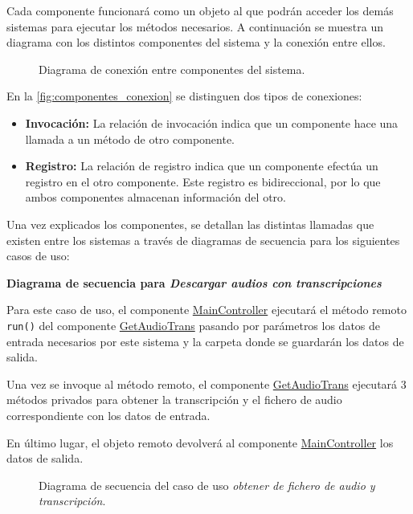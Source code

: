 \documentclass[../main.tex]{subfiles}
\begin{document}
Cada componente funcionará como un objeto al que podrán acceder los demás sistemas para ejecutar los métodos necesarios. A continuación se muestra un diagrama con los distintos componentes del sistema y la conexión entre ellos.

\begin{figure}[H]
    \centering
    
    \caption{Diagrama de conexión entre componentes del sistema.}
    \label{fig:componentes_conexion}
\end{figure}

En la \autoref{fig:componentes_conexion} se distinguen dos tipos de conexiones:
\begin{itemize}
    \item \textbf{Invocación:} La relación de invocación indica que un componente hace una llamada a un método de otro componente.
    \item \textbf{Registro:} La relación de registro indica que un componente efectúa un registro en el otro componente. Este registro es bidireccional, por lo que ambos componentes almacenan información del otro.
\end{itemize}

Una vez explicados los componentes, se detallan las distintas llamadas que existen entre los sistemas a través de diagramas de secuencia para los siguientes casos de uso:

\textbf{Diagrama de secuencia para \textit{Descargar audios con transcripciones}}

Para este caso de uso, el componente \hyperref[par:maincontroller]{MainController} ejecutará el método remoto \verb+run()+ del componente  \hyperref[par:getaudiotrans]{GetAudioTrans} pasando por parámetros los datos de entrada necesarios por este sistema y la carpeta donde se guardarán los datos de salida.

Una vez se invoque al método remoto, el componente \hyperref[par:getaudiotrans]{GetAudioTrans} ejecutará 3 métodos privados para obtener la transcripción y el fichero de audio correspondiente con los datos de entrada.

En último lugar, el objeto remoto devolverá al componente \hyperref[par:maincontroller]{MainController} los datos de salida.

\begin{figure}[H]
    \centering
    
    \caption{Diagrama de secuencia del caso de uso \textit{obtener de fichero de audio y transcripción}.}
    \label{fig:flow_getaudiotrans}
\end{figure}
\end{document}

